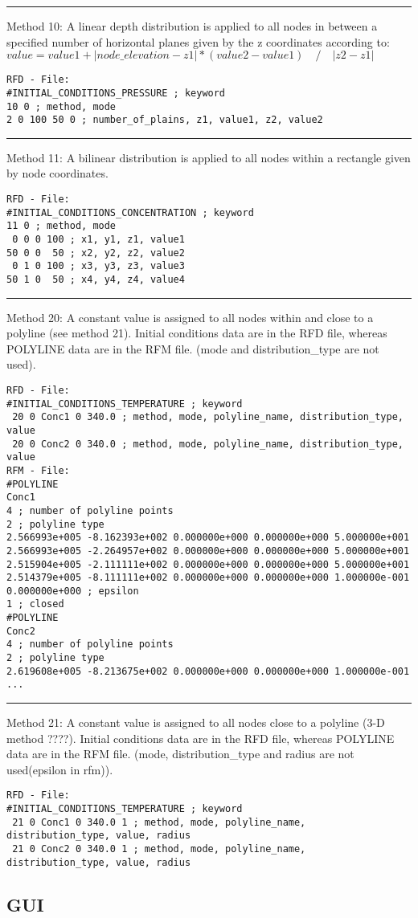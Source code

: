 \hrule
Method 10:
A linear depth distribution is applied to all nodes in between a specified number
of horizontal planes given by the z coordinates according to: \newline
$value = value1 + |node\_elevation -z1| * (value2 - value1) \quad / \quad |z2 - z1| $
%
\small
\begin{verbatim}
RFD - File:
#INITIAL_CONDITIONS_PRESSURE ; keyword
10 0 ; method, mode
2 0 100 50 0 ; number_of_plains, z1, value1, z2, value2
\end{verbatim}
\normalsize

\hrule
Method 11:
A bilinear distribution is applied to all nodes within a rectangle given by
node coordinates.
%
\small
\begin{verbatim}
RFD - File:
#INITIAL_CONDITIONS_CONCENTRATION ; keyword
11 0 ; method, mode
 0 0 0 100 ; x1, y1, z1, value1
50 0 0  50 ; x2, y2, z2, value2
 0 1 0 100 ; x3, y3, z3, value3
50 1 0  50 ; x4, y4, z4, value4
\end{verbatim}
\normalsize

\hrule
Method 20:
A constant value is assigned to all nodes within and close to a polyline (see method 21).
Initial conditions data are in the RFD file, whereas POLYLINE data are in the RFM file.\newline
(mode and distribution\_type are not used).
%
\small
\begin{verbatim}
RFD - File:
#INITIAL_CONDITIONS_TEMPERATURE ; keyword
 20 0 Conc1 0 340.0 ; method, mode, polyline_name, distribution_type, value
 20 0 Conc2 0 340.0 ; method, mode, polyline_name, distribution_type, value
RFM - File:
#POLYLINE
Conc1
4 ; number of polyline points
2 ; polyline type
2.566993e+005 -8.162393e+002 0.000000e+000 0.000000e+000 5.000000e+001
2.566993e+005 -2.264957e+002 0.000000e+000 0.000000e+000 5.000000e+001
2.515904e+005 -2.111111e+002 0.000000e+000 0.000000e+000 5.000000e+001
2.514379e+005 -8.111111e+002 0.000000e+000 0.000000e+000 1.000000e-001
0.000000e+000 ; epsilon
1 ; closed
#POLYLINE
Conc2
4 ; number of polyline points
2 ; polyline type
2.619608e+005 -8.213675e+002 0.000000e+000 0.000000e+000 1.000000e-001
...
\end{verbatim}
\normalsize

\hrule
Method 21:
A constant value is assigned to all nodes close to a polyline (3-D method ????).
Initial conditions data are in the RFD file, whereas POLYLINE data are in the RFM file.\newline
(mode, distribution\_type and radius are not used(epsilon in rfm)).
%
\small
\begin{verbatim}
RFD - File:
#INITIAL_CONDITIONS_TEMPERATURE ; keyword
 21 0 Conc1 0 340.0 1 ; method, mode, polyline_name, distribution_type, value, radius
 21 0 Conc2 0 340.0 1 ; method, mode, polyline_name, distribution_type, value, radius
\end{verbatim}
\normalsize

\subsection{GUI}



